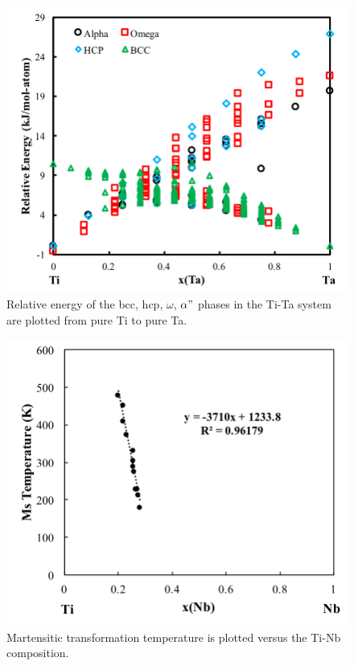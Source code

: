 \pagebreak
\begin{figure}[H]
	\centering
	\includegraphics[width=\textwidth]{Chapter-7/Figures/tita0k.png}
	\caption{Relative energy of the bcc, hcp, $\omega$, $\alpha"$ phases in the Ti-Ta system are plotted from pure Ti to pure Ta.}
	\label{Ch7-figure:titab0K}
\end{figure}

\pagebreak
\begin{figure}[H]
	\centering
	\includegraphics[width=\textwidth]{Chapter-7/Figures/tinbms.png}
	\caption{Martensitic transformation temperature is plotted versus the Ti-Nb composition.}
	\label{Ch7-figure:titnbms}
\end{figure}

